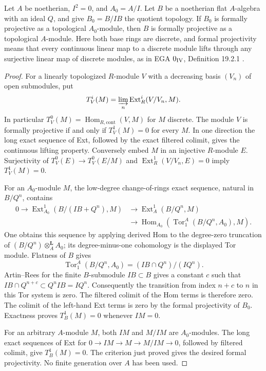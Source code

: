 \begin{lemma}
\label{SA23-A-18}
Let $A$ be noetherian, $I^2=0$, and $A_0=A/I$. Let $B$ be a
noetherian flat $A$-algebra with an ideal $Q$, and give
$B_0=B/IB$ the quotient topology. If $B_0$ is formally projective
as a topological $A_0$-module, then $B$ is formally projective as
a topological $A$-module. Here both base rings are discrete, and
formal projectivity means that every continuous linear map to a
discrete module lifts through any surjective linear map of discrete
modules, as in EGA $0_{\rm IV}$, Definition 19.2.1
\cite{algEGAIV1}.
\end{lemma}
\begin{proof}
For a linearly topologized $R$-module $V$ with a decreasing basis
$(V_n)$ of open submodules, put
\[
 T^i_V(M)=\varinjlim_n\operatorname{Ext}^i_R(V/V_n,M).
\]
In particular $T^0_V(M)=\operatorname{Hom}_{R,\mathrm{cont}}(V,M)$
for $M$ discrete. The module $V$ is formally projective if and
only if $T^1_V(M)=0$ for every $M$. In one direction the long
exact sequence of Ext, followed by the exact filtered colimit,
gives the continuous lifting property. Conversely embed $M$ in
an injective $R$-module $E$. Surjectivity of
$T^0_V(E)\to T^0_V(E/M)$ and
$\operatorname{Ext}^1_R(V/V_n,E)=0$ imply $T^1_V(M)=0$.

For an $A_0$-module $M$, the low-degree change-of-rings exact
sequence, natural in $B/Q^n$, contains
\[
\begin{split}
0\longrightarrow
 \operatorname{Ext}^1_{A_0}(B/(IB+Q^n),M)
 &\longrightarrow\operatorname{Ext}^1_A(B/Q^n,M)\\
 &\longrightarrow
 \operatorname{Hom}_{A_0}
 (\operatorname{Tor}_1^A(B/Q^n,A_0),M).
\end{split}
\]
One obtains this sequence by applying derived Hom to the
degree-zero truncation of
$(B/Q^n)\otimes_A^{\mathbf L}A_0$; its degree-minus-one
cohomology is the displayed Tor module. Flatness of $B$ gives
\[
 \operatorname{Tor}_1^A(B/Q^n,A_0)
   =(IB\cap Q^n)/(IQ^n).
\]
Artin--Rees \cite[Lemma 10.51.2]{rootStacksArtinRees} for the
finite $B$-submodule $IB\subset B$ gives a
constant $c$ such that $IB\cap Q^{n+c}\subset Q^nIB=IQ^n$.
Consequently the transition from index $n+c$ to $n$ in this Tor
system is zero. The filtered colimit of the Hom terms is therefore
zero. The colimit of the left-hand Ext terms is zero by the
formal projectivity of $B_0$. Exactness proves
$T^1_B(M)=0$ whenever $IM=0$.

For an arbitrary $A$-module $M$, both $IM$ and $M/IM$ are
$A_0$-modules. The long exact sequences of Ext for
$0\to IM\to M\to M/IM\to0$, followed by filtered colimit,
give $T^1_B(M)=0$. The criterion just proved gives the desired
formal projectivity. No finite generation over $A$ has been used.
\end{proof}


